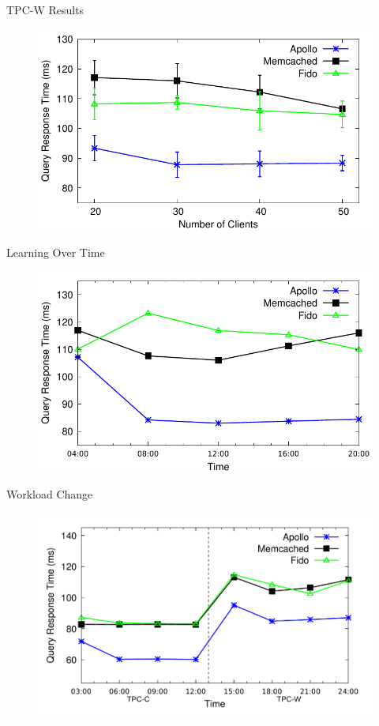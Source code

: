 \documentclass[12pt]{beamer}
\begin{document}
\begin{frame}[fragile]{TPC-W Results}
    \begin{figure}
        \center
        \includegraphics[scale=0.7]{apollo_tpcw}
    \end{figure}
\end{frame}

\begin{frame}[fragile]{Learning Over Time}
    \begin{figure}
        \center
        \includegraphics[scale=0.7]{apollo_30_intervals}
    \end{figure}
\end{frame}

\begin{frame}[fragile]{Workload Change}
    \begin{figure}
        \center
        \includegraphics[scale=0.11]{apollo_wl_change}
    \end{figure}
\end{frame}
\end{document}
